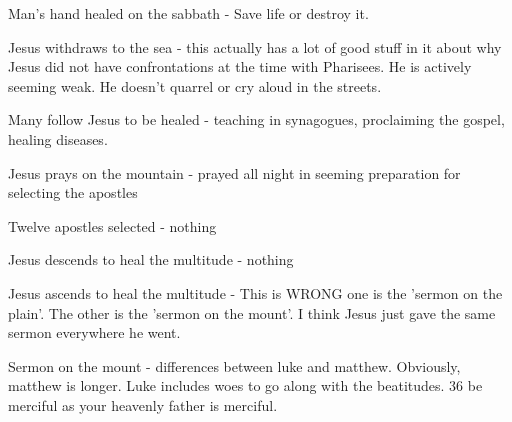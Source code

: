 Man's hand healed on the sabbath - Save life or destroy it.

Jesus withdraws to the sea - this actually has a lot of good stuff in it about why Jesus did not have confrontations at the time with Pharisees.  He is actively seeming weak.  He doesn't quarrel or cry aloud in the streets.  

Many follow Jesus to be healed - teaching in synagogues, proclaiming the gospel, healing diseases.

Jesus prays on the mountain - prayed all night in seeming preparation for selecting the apostles

Twelve apostles selected - nothing

Jesus descends to heal the multitude - nothing

Jesus ascends to heal the multitude - This is WRONG one is the 'sermon on the plain'.  The other is the 'sermon on the mount'.  I think Jesus just gave the same sermon everywhere he went.

Sermon on the mount - differences between luke and matthew.  Obviously, matthew is longer.  Luke includes woes to go along with the beatitudes.  36 be merciful as your heavenly father is merciful.
